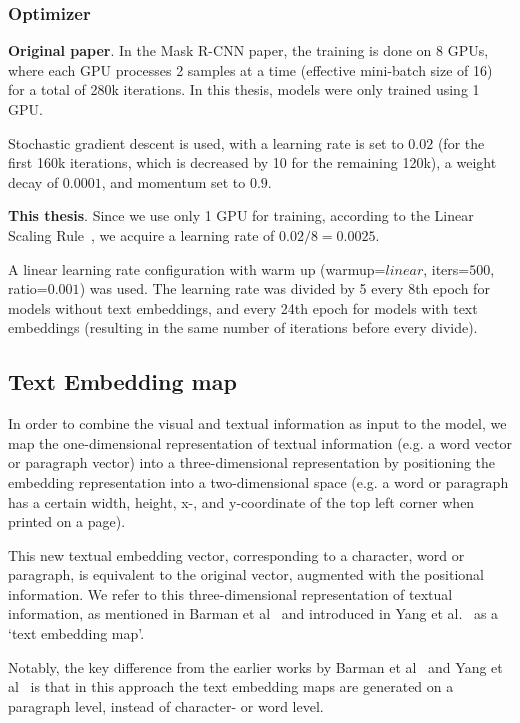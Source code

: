 \documentclass[oneside, english, bibtex]{kththesis}
\begin{document}
\subsubsection{Optimizer}

\textbf{Original paper}. In the Mask R-CNN paper, the training is done on 8 GPUs, where each GPU processes 2 samples at a time (effective mini-batch size of 16) for a total of 280k iterations.
In this thesis, models were only trained using 1 GPU.

Stochastic gradient descent is used, with a learning rate is set to $0.02$ (for the first 160k iterations, which is decreased by 10 for the remaining 120k), a weight decay of $0.0001$, and momentum set to $0.9$.

\textbf{This thesis}. Since we use only 1 GPU for training, according to the Linear Scaling Rule~\cite{DBLP:journals/corr/GoyalDGNWKTJH17}, we acquire a learning rate of $0.02/8=0.0025$.

A linear learning rate configuration with warm up (warmup=$linear$, iters=$500$, ratio=$0.001$) was used. The learning rate was divided by 5 every 8th epoch for models without text embeddings, and every 24th epoch for models with text embeddings (resulting in the same number of iterations before every divide). 


\subsection{Text Embedding map}

In order to combine the visual and textual information as input to the model, we map the one-dimensional representation of textual information (e.g. a word vector or paragraph vector) into a three-dimensional representation by positioning the embedding representation into a two-dimensional space (e.g. a word or paragraph has a certain width, height, x-, and y-coordinate of the top left corner when printed on a page).

This new textual embedding vector, corresponding to a character, word or paragraph, is equivalent to the original vector, augmented with the positional information. We refer to this three-dimensional representation of textual information, as mentioned in Barman et al~\cite{jdmdh:7097} and introduced in Yang et al.~\cite{DBLP:journals/corr/YangYAKKG17} as a ‘text embedding map’.

Notably, the key difference from the earlier works by Barman et al~\cite{jdmdh:7097} and Yang et al~\cite{DBLP:journals/corr/YangYAKKG17} is that in this approach the text embedding maps are generated on a paragraph level, instead of character- or word level.
\end{document}

